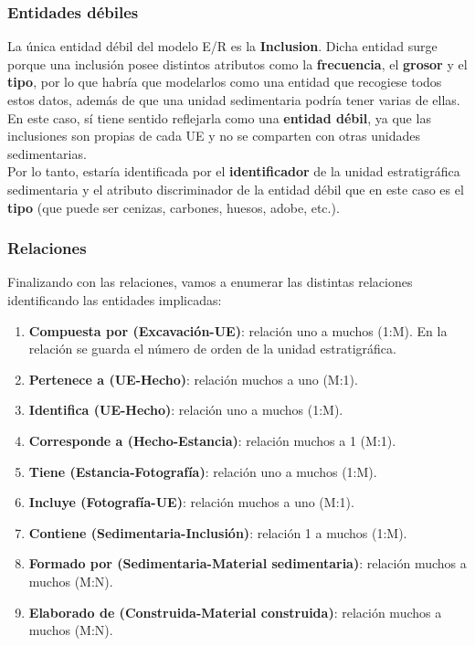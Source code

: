     \subsubsection{Entidades débiles}
    La única entidad débil del modelo E/R es la \textbf{\gls{Inclusion}}. Dicha entidad surge
    porque una inclusión posee distintos atributos como la \textbf{frecuencia}, el \textbf{grosor}
    y el \textbf{tipo}, por lo que habría que modelarlos como una entidad que recogiese todos estos
    datos, además de que una unidad sedimentaria podría tener varias de ellas. En este caso, sí
    tiene sentido reflejarla como una \textbf{entidad débil}, ya que las inclusiones son propias de
    cada UE y no se comparten con otras unidades sedimentarias.\\

    Por lo tanto, estaría identificada por el \textbf{identificador} de la unidad estratigráfica
    sedimentaria y el atributo discriminador de la entidad débil que en este caso es el
    \textbf{tipo} (que puede ser cenizas, carbones, huesos, adobe, etc.).

    \subsubsection{Relaciones}
    Finalizando con las relaciones, vamos a enumerar las distintas relaciones identificando las
    entidades implicadas:

        \begin{enumerate}
            \item \textbf{Compuesta por (Excavación-UE)}: relación uno a muchos (1:M). En la
            relación se guarda el número de orden de la unidad estratigráfica.
            \item \textbf{Pertenece a (UE-Hecho)}: relación muchos a uno (M:1).
            \item \textbf{Identifica (UE-Hecho)}: relación uno a muchos (1:M).
            \item \textbf{Corresponde a (Hecho-Estancia)}: relación muchos a 1 (M:1).
            \item \textbf{Tiene (Estancia-Fotografía)}: relación uno a muchos (1:M).
            \item \textbf{Incluye (Fotografía-UE)}: relación muchos a uno (M:1).
            \item \textbf{Contiene (Sedimentaria-Inclusión)}: relación 1 a muchos (1:M).
            \item \textbf{Formado por (Sedimentaria-Material sedimentaria)}: relación muchos a
            muchos (M:N).
            \item \textbf{Elaborado de (Construida-Material construida)}: relación muchos a
            muchos (M:N).
        \end{enumerate}


